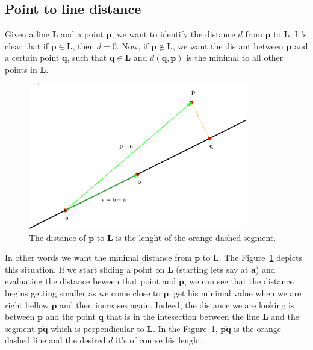 \subsection{Point to line distance}
\label{sec:point2line}

Given a line $\mathbf{L}$ and a point $\mathbf{p}$, we want to identify the distance $d$ from $\mathbf{p}$ to $\mathbf{L}$.
It's clear that if $\mathbf{p} \in \mathbf{L}$, then $d = 0$.
Now, if $\mathbf{p} \notin \mathbf{L}$, we want the distant between $\mathbf{p}$ and a certain point $\mathbf{q}$, such that $\mathbf{q} \in \mathbf{L}$ and $d(\mathbf{q}, \mathbf{p})$ is the minimal to all other points in $\mathbf{L}$.

\begin{figure}[htb]
  \centering
  \includegraphics[width=0.85\textwidth]{img/line2point}
  \caption{The distance of $\mathbf{p}$ to $\mathbf{L}$ is the lenght of the orange dashed segment.}
  \label{fig:point2line}
\end{figure}

In other words we want the minimal distance from $\mathbf{p}$ to $\mathbf{L}$.
The Figure~\ref{fig:point2line} depicts this situation.
If we start sliding a point on $\mathbf{L}$ (starting lets say at $\mathbf{a}$) and evaluating the distance beween that point and $\mathbf{p}$, we can see that the distance begins getting smaller as we come close to $\mathbf{p}$, get his minimal value when we are right bellow $\mathbf{p}$ and then increases again. 
Indeed, the distance we are looking is between $\mathbf{p}$ and the point $\mathbf{q}$ that is in the intesection between the line $\mathbf{L}$ and the segment $\overline{\mathbf{p} \mathbf{q}}$ which is perpendicular to $\mathbf{L}$.
In the Figure~\ref{fig:point2line}, $\overline{\mathbf{p} \mathbf{q}}$ is the orange dashed line and the desired $d$ it's of course his lenght.

